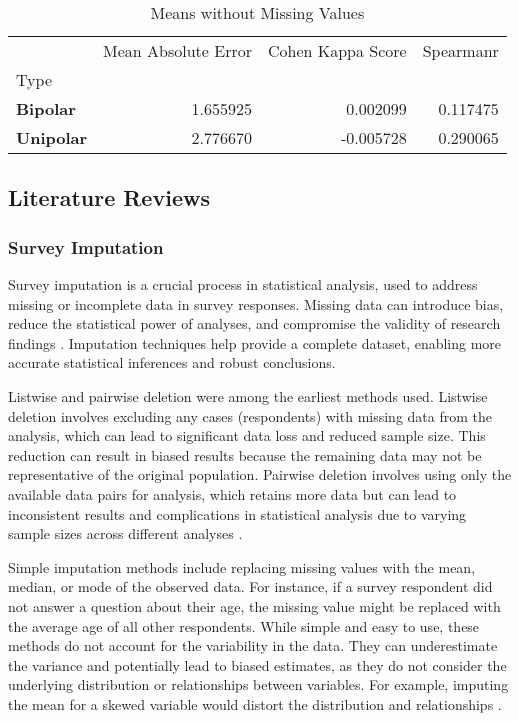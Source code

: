 \begin{table}[H]
    \begin{tabular}{lrrr}
    \toprule
     & Mean Absolute Error & Cohen Kappa Score & Spearmanr \\
    Type &  &  &  \\
    \midrule
    \textbf{Bipolar} & 1.655925 & 0.002099 & 0.117475 \\
    \textbf{Unipolar} & 2.776670 & -0.005728 & 0.290065 \\
    \bottomrule
    \end{tabular}
    \caption{Means without Missing Values}
\end{table}
    

\subsection*{Literature Reviews}

\subsubsection*{Survey Imputation}
Survey imputation is a crucial process in statistical analysis, used to address missing or incomplete data in survey responses. Missing data can introduce bias, reduce the statistical power of analyses, and compromise the validity of research findings \cite{little2019statistical, Schafer1999MultipleIA}. Imputation techniques help provide a complete dataset, enabling more accurate statistical inferences and robust conclusions.

Listwise and pairwise deletion were among the earliest methods used. Listwise deletion involves excluding any cases (respondents) with missing data from the analysis, which can lead to significant data loss and reduced sample size. This reduction can result in biased results because the remaining data may not be representative of the original population. Pairwise deletion involves using only the available data pairs for analysis, which retains more data but can lead to inconsistent results and complications in statistical analysis due to varying sample sizes across different analyses \cite{kang2013prevention}.

Simple imputation methods include replacing missing values with the mean, median, or mode of the observed data. For instance, if a survey respondent did not answer a question about their age, the missing value might be replaced with the average age of all other respondents. While simple and easy to use, these methods do not account for the variability in the data. They can underestimate the variance and potentially lead to biased estimates, as they do not consider the underlying distribution or relationships between variables. For example, imputing the mean for a skewed variable would distort the distribution and relationships \cite{little2019statistical}.

